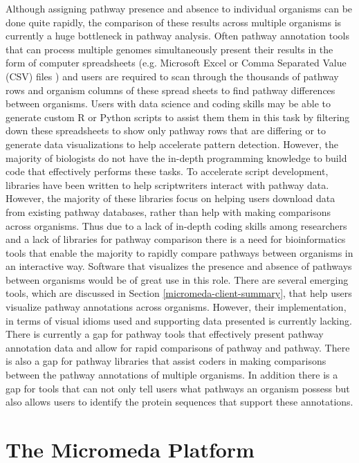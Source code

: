 Although assigning pathway presence and absence to individual organisms can be done quite rapidly, the comparison of these results across multiple organisms is currently a huge bottleneck in pathway analysis. Often pathway annotation tools that can process multiple genomes simultaneously present their results in the form of computer spreadsheets (e.g. Microsoft Excel or Comma Separated Value (CSV) files \cite{RFC4180}) and users are required to scan through the thousands of pathway rows and organism columns of these spread sheets to find pathway differences between organisms. Users with data science and coding skills may be able to generate custom R or Python scripts to assist them them in this task by filtering down these spreadsheets to show only pathway rows that are differing or to generate data visualizations to help accelerate pattern detection. However, the majority of biologists do not have the in-depth programming knowledge to build code that effectively performs these tasks. To accelerate script development, libraries have been written to help scriptwriters interact with pathway data. However, the majority of these libraries focus on helping users download data from existing pathway databases, rather than help with making comparisons across organisms. Thus due to a lack of in-depth coding skills among researchers and a lack of libraries for pathway comparison there is a need for bioinformatics tools that enable the majority to rapidly compare pathways between organisms in an interactive way. Software that visualizes the presence and absence of pathways between organisms would be of great use in this role. There are several emerging tools, which are discussed in Section \ref{micromeda-client-summary}, that help users visualize pathway annotations across organisms. However, their implementation, in terms of visual idioms used and supporting data presented is currently lacking. There is currently a gap for pathway tools that effectively present pathway annotation data and allow for rapid comparisons of pathway and pathway. There is also a gap for pathway libraries that assist coders in making comparisons between the pathway annotations of multiple organisms. In addition there is a gap for tools that can not only tell users what pathways an organism possess but also allows users to identify the protein sequences that support these annotations.

\section{The Micromeda Platform}

